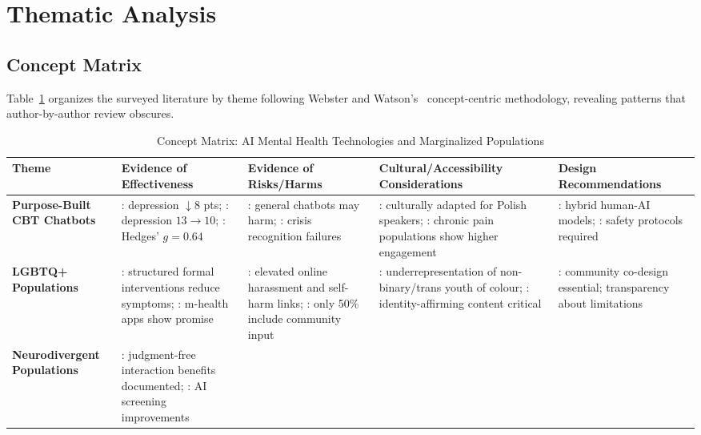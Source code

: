 \section{Thematic Analysis}

\subsection{Concept Matrix}

Table~\ref{tab:concept_matrix} organizes the surveyed literature by theme following Webster and Watson's~\cite{webster_watson_2002} concept-centric methodology, revealing patterns that author-by-author review obscures.

\begin{table}[!ht]
\centering
\caption{Concept Matrix: AI Mental Health Technologies and Marginalized Populations}
\label{tab:concept_matrix}
\renewcommand{\arraystretch}{1.25}
\begin{tabularx}{\textwidth}{>{\bfseries}p{2.4cm} X X X X}
\toprule
\textbf{Theme} & \textbf{Evidence of Effectiveness} & \textbf{Evidence of Risks/Harms} & \textbf{Cultural/Accessibility Considerations} & \textbf{Design Recommendations} \\
\midrule
Purpose-Built CBT Chatbots
& \cite{karkosz_2024}: depression $\downarrow$8 pts; \cite{meheli_2022}: depression $13\to10$; \cite{li_2023}: Hedges' $g=0.64$
& \cite{he_2022}: general chatbots may harm; \cite{de_freitas_2024}: crisis recognition failures
& \cite{karkosz_2024}: culturally adapted for Polish speakers; \cite{meheli_2022}: chronic pain populations show higher engagement
& \cite{rollwage_2024}: hybrid human-AI models; \cite{smith_2023}: safety protocols required \\
\midrule
LGBTQ+ Populations
& \cite{liu_2023}: structured formal interventions reduce symptoms; \cite{drydakis_2022}: m-health apps show promise
& \cite{tanni_2024}: elevated online harassment and self-harm links; \cite{fowler_2023}: only 50\% include community input
& \cite{liu_2023}: underrepresentation of non-binary/trans youth of colour; \cite{fowler_2023}: identity-affirming content critical
& \cite{liu_2023,fowler_2023}: community co-design essential; transparency about limitations \\
\midrule
Neurodivergent Populations
& \cite{papadopoulos_2025}: judgment-free interaction benefits documented; \cite{dehghani_2024}: AI screening improvements

\end{tabularx}
\end{table}
